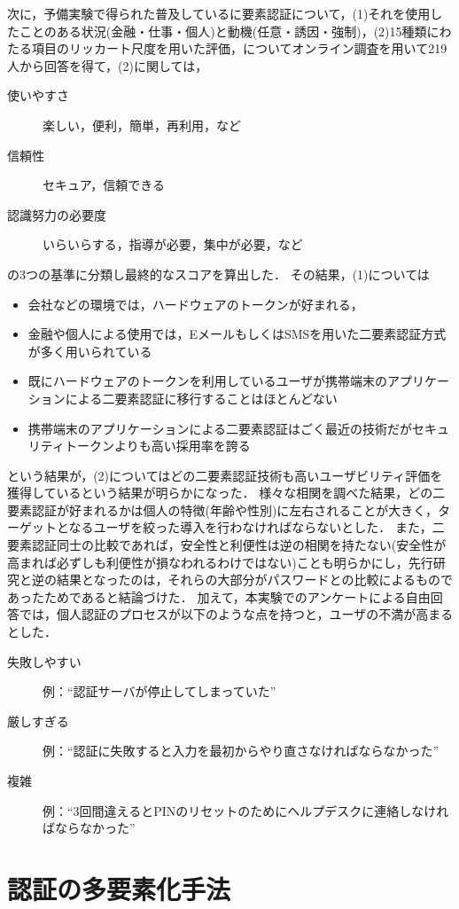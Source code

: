 次に，予備実験で得られた普及しているに要素認証について，(1)それを使用したことのある状況(金融・仕事・個人)と動機(任意・誘因・強制)，(2)15種類にわたる項目のリッカート尺度を用いた評価，についてオンライン調査を用いて219人から回答を得て，(2)に関しては，
\begin{description}
  \item[使いやすさ] 楽しい，便利，簡単，再利用，など
  \item[信頼性] セキュア，信頼できる
  \item[認識努力の必要度] いらいらする，指導が必要，集中が必要，など
\end{description}
の3つの基準に分類し最終的なスコアを算出した．
その結果，(1)については
\begin{itemize}
  \item 会社などの環境では，ハードウェアのトークンが好まれる，
  \item 金融や個人による使用では，EメールもしくはSMSを用いた二要素認証方式が多く用いられている
  \item 既にハードウェアのトークンを利用しているユーザが携帯端末のアプリケーションによる二要素認証に移行することはほとんどない
  \item 携帯端末のアプリケーションによる二要素認証はごく最近の技術だがセキュリティトークンよりも高い採用率を誇る
\end{itemize}
という結果が，(2)についてはどの二要素認証技術も高いユーザビリティ評価を獲得しているという結果が明らかになった．
様々な相関を調べた結果，どの二要素認証が好まれるかは個人の特徴(年齢や性別)に左右されることが大きく，ターゲットとなるユーザを絞った導入を行わなければならないとした．
また，二要素認証同士の比較であれば，安全性と利便性は逆の相関を持たない(安全性が高まれば必ずしも利便性が損なわれるわけではない)ことも明らかにし，先行研究と逆の結果となったのは，それらの大部分がパスワードとの比較によるものであったためであると結論づけた．
加えて，本実験でのアンケートによる自由回答では，個人認証のプロセスが以下のような点を持つと，ユーザの不満が高まるとした．
\begin{description}
  \item[失敗しやすい] 例：``認証サーバが停止してしまっていた''
  \item[厳しすぎる] 例：``認証に失敗すると入力を最初からやり直さなければならなかった''
  \item[複雑] 例：``3回間違えるとPINのリセットのためにヘルプデスクに連絡しなければならなかった''
\end{description}

\section{認証の多要素化手法}\label{sec:multifactor}

